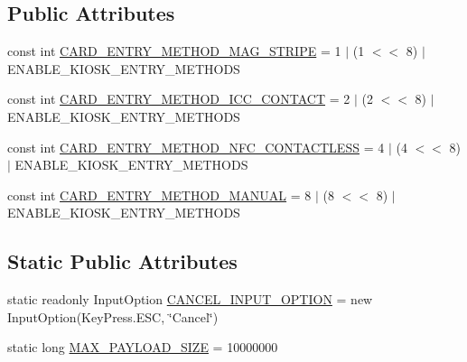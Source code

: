 \subsection*{Public Attributes}
\begin{DoxyCompactItemize}
\item 
const int \hyperlink{classcom_1_1clover_1_1remotepay_1_1sdk_1_1_clover_connector_ac20215373cd03e34e424720009ae19e3}{C\+A\+R\+D\+\_\+\+E\+N\+T\+R\+Y\+\_\+\+M\+E\+T\+H\+O\+D\+\_\+\+M\+A\+G\+\_\+\+S\+T\+R\+I\+PE} = 1 $\vert$ (1 $<$$<$ 8) $\vert$ E\+N\+A\+B\+L\+E\+\_\+\+K\+I\+O\+S\+K\+\_\+\+E\+N\+T\+R\+Y\+\_\+\+M\+E\+T\+H\+O\+DS
\item 
const int \hyperlink{classcom_1_1clover_1_1remotepay_1_1sdk_1_1_clover_connector_ad701af029fa86c4c128c3c633e3c75c7}{C\+A\+R\+D\+\_\+\+E\+N\+T\+R\+Y\+\_\+\+M\+E\+T\+H\+O\+D\+\_\+\+I\+C\+C\+\_\+\+C\+O\+N\+T\+A\+CT} = 2 $\vert$ (2 $<$$<$ 8) $\vert$ E\+N\+A\+B\+L\+E\+\_\+\+K\+I\+O\+S\+K\+\_\+\+E\+N\+T\+R\+Y\+\_\+\+M\+E\+T\+H\+O\+DS
\item 
const int \hyperlink{classcom_1_1clover_1_1remotepay_1_1sdk_1_1_clover_connector_ad07e709975763f5f72268ee7d1fe7dbb}{C\+A\+R\+D\+\_\+\+E\+N\+T\+R\+Y\+\_\+\+M\+E\+T\+H\+O\+D\+\_\+\+N\+F\+C\+\_\+\+C\+O\+N\+T\+A\+C\+T\+L\+E\+SS} = 4 $\vert$ (4 $<$$<$ 8) $\vert$ E\+N\+A\+B\+L\+E\+\_\+\+K\+I\+O\+S\+K\+\_\+\+E\+N\+T\+R\+Y\+\_\+\+M\+E\+T\+H\+O\+DS
\item 
const int \hyperlink{classcom_1_1clover_1_1remotepay_1_1sdk_1_1_clover_connector_a94afe7324fa5df3937c0140bf4596733}{C\+A\+R\+D\+\_\+\+E\+N\+T\+R\+Y\+\_\+\+M\+E\+T\+H\+O\+D\+\_\+\+M\+A\+N\+U\+AL} = 8 $\vert$ (8 $<$$<$ 8) $\vert$ E\+N\+A\+B\+L\+E\+\_\+\+K\+I\+O\+S\+K\+\_\+\+E\+N\+T\+R\+Y\+\_\+\+M\+E\+T\+H\+O\+DS
\end{DoxyCompactItemize}
\subsection*{Static Public Attributes}
\begin{DoxyCompactItemize}
\item 
static readonly Input\+Option \hyperlink{classcom_1_1clover_1_1remotepay_1_1sdk_1_1_clover_connector_a1e3f722dd21198b83ac8eecbac983eb2}{C\+A\+N\+C\+E\+L\+\_\+\+I\+N\+P\+U\+T\+\_\+\+O\+P\+T\+I\+ON} = new Input\+Option(Key\+Press.\+E\+SC, \char`\"{}Cancel\char`\"{})
\item 
static long \hyperlink{classcom_1_1clover_1_1remotepay_1_1sdk_1_1_clover_connector_a0468d9790b0fac75a65cfb9a709c01aa}{M\+A\+X\+\_\+\+P\+A\+Y\+L\+O\+A\+D\+\_\+\+S\+I\+ZE} = 10000000
\end{DoxyCompactItemize}
